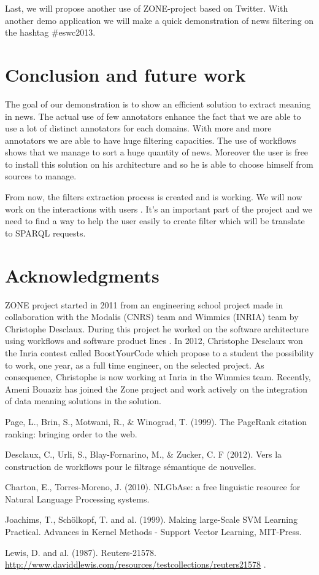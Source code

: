 \documentclass{llncs}
\begin{document}
Last, we will propose another use of ZONE-project based on Twitter. With another demo application we will make a quick demonstration of news filtering on the hashtag \#eswc2013.

\section{Conclusion and future work}
%
The goal of our demonstration is to show an efficient solution to extract meaning in news. The actual use of few annotators enhance the fact that we are able to use a lot of distinct annotators for each domains. With more and more annotators we are able to have huge filtering capacities. The use of workflows shows that we manage to sort a huge quantity of news. Moreover the user is free to install this solution on his architecture and so he is able to choose himself from sources to manage.

From now, the filters extraction process is created and is working. We will now work on the interactions with users . It's an important part of the project and we need to find a way to help the user easily to create filter which will be translate to SPARQL requests.

\section{Acknowledgments}
%
ZONE project started in 2011 from an engineering school project made in collaboration with the Modalis (CNRS) team and Wimmics (INRIA) team by Christophe Desclaux. During this project he worked on the software architecture using workflows and software product lines \cite{desclaux:urli}. In 2012, Christophe Desclaux won the Inria contest called BoostYourCode which propose to a student the possibility to work, one year, as a full time engineer, on the selected project. As consequence, Christophe is now working at Inria in the Wimmics team.  Recently, Ameni Bouaziz has joined the Zone project and work actively on the integration of data meaning solutions in the solution.
%
%
\begin{thebibliography}{5}
%
Page, L., Brin, S., Motwani, R., \& Winograd, T. (1999). The PageRank citation ranking: bringing order to the web.

Desclaux, C., Urli, S., Blay-Fornarino, M., \& Zucker, C. F (2012). Vers la construction de workflows pour le filtrage sémantique de nouvelles.

Charton, E., Torres-Moreno, J. (2010). NLGbAse: a free linguistic resource for Natural Language Processing systems.


Joachims, T., Schölkopf, T. and al. (1999). Making large-Scale SVM Learning Practical. Advances in Kernel Methods - Support Vector Learning, MIT-Press. 

Lewis, D. and al. (1987). Reuters-21578.\\
\url{http://www.daviddlewis.com/resources/testcollections/reuters21578}
.
\end{thebibliography}

\clearpage
\end{document}
